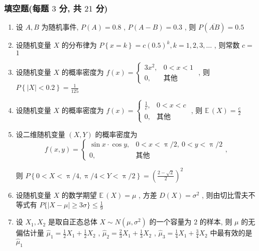 \documentclass[cn,11pt,fancy,hide]{elegantbook}
\newcommand{\EE}{\mathbb{E}\,}
\renewcommand{\leq}{\leqslant}
\renewcommand{\geq}{\geqslant}
\begin{document}
\subsubsection{填空题(每题 $3$ 分, 共 $21$ 分)}
\begin{enumerate}
	\item 设 $A,B$ 为随机事件, $P(A)=0.8$ , $P(A-B)=0.3$ , 则 $P\left(\overline{AB}\right)=$\underline{\hspace{1pc}$0.5$\hspace{1pc}}
	
	\item 设随机变量 $X$ 的分布律为 $P\left\{x=k\right\}=c(0.5)^k,k=1,2,3,\ldots$ , 则常数 $c=$\underline{\hspace{1pc}$1$\hspace{1pc}}
	
	\item 设随机变量 $X$ 的概率密度为 $f(x)=
	\begin{cases}
	3x^2, & 0<x<1\\
	0, & \text{其他}
	\end{cases}
	$ , 则 $P\left\{\left|X\right|<0.2\right\}=$\underline{\hspace{1pc}$\frac{1}{125}$\hspace{1pc}}
	
	\item 设随机变量 $X$ 的概率密度为 $f(x)=
	\begin{cases}
	\frac{1}{c}, & 0<x<c\\
	0, & \text{其他}
	\end{cases}
	$ , 则 $\EE(X)=$\underline{\hspace{1pc}$\frac{c}{2}$\hspace{1pc}}
	
	\item 设二维随机变量 $(X,Y)$ 的概率密度为
	\begin{equation*}
	f(x,y)=
	\begin{cases}
	\sin x\cdot\cos y, & 0<x<\uppi/2,\ 0<y<\uppi/2\\
	0, & \text{其他}
	\end{cases}
	,
	\end{equation*}
	
	则 $P\left\{0<X<\uppi/4,\uppi/4<Y<\uppi/2\right\}=$\underline{\hspace{1pc}$\left( \frac{2-\sqrt{2}}{2} \right)^2$\hspace{1pc}}
	
	\item 设随机变量 $X$ 的数学期望 $\EE(X)=\mu$ , 方差 $D(X)=\sigma^2$ , 则由切比雪夫不等式有 $P\{|X-\mu|\geq3\sigma\}\leq$\underline{\hspace{1pc}$\frac{1}{9}$\hspace{1pc}}
	
	\item 设 $X_1,X_2$ 是取自正态总体 $X\sim N\left(\mu,\sigma^2\right)$ 的一个容量为 $2$ 的样本, 则 $\mu$ 的无偏估计量 $\hat\mu_1=\frac{1}{2}X_1+\frac{1}{2}X_2$ , $\hat\mu_2=\frac{2}{3}X_1+\frac{1}{3}X_2$ , $\hat\mu_3=\frac{1}{4}X_1+\frac{3}{4}X_2$ 中最有效的是\underline{\hspace{1pc}$\hat\mu_1$\hspace{1pc}}
\end{enumerate}
\end{document}
